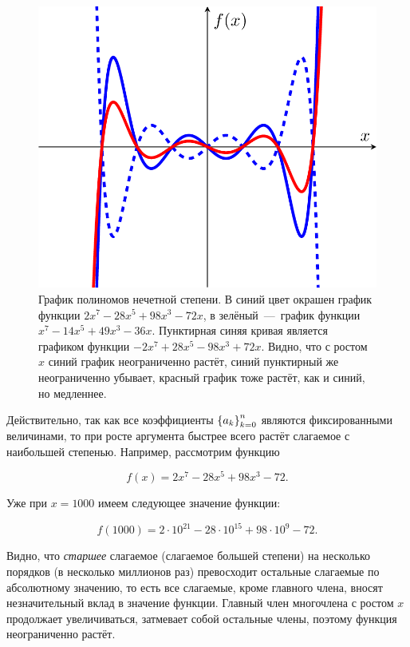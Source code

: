\documentclass[12pt]{article}
\begin{document}
\begin{figure}[htbp]
  \label{fig:1}
	\centering
	\includegraphics[width=1\linewidth]{fig1}
	\caption{График полиномов нечетной степени. В синий цвет окрашен график функции $2x^{7} - 28 x^{5} + 98 x^{3} - 72 x$, в зелёный~\----~график функции $x^{7} - 14 x^{5} + 49 x^{3} - 36 x$. Пунктирная синяя кривая является графиком функции $-2x^{7} + 28 x^{5} -98 x^{3} + 72 x$. Видно, что с ростом $x$ синий график неограниченно растёт, синий пунктирный же неограниченно убывает, красный график тоже растёт, как и синий, но медленнее.}
\end{figure}

Действительно, так как все коэффициенты $\qty{a_k}_{k=0}^n$ являются фиксированными величинами, то при росте аргумента быстрее всего растёт слагаемое с наибольшей степенью. Например, рассмотрим функцию

\begin{equation}
f(x)=2x^{7} - 28 x^{5} + 98 x^{3} - 72.
\end{equation}

Уже при $x = 1000$ имеем следующее значение функции:

\begin{equation}
f(1000) = 2 \cdot 10^{21} - 28 \cdot 10^{15} + 98 \cdot 10^9 - 72.
\end{equation}

Видно, что \emph{старшее} слагаемое (слагаемое большей степени) на несколько порядков (в несколько миллионов раз) превосходит остальные слагаемые по абсолютному значению, то есть все слагаемые, кроме главного члена, вносят незначительный вклад в значение функции. Главный член многочлена с ростом $x$ продолжает увеличиваться, затмевает собой остальные члены, поэтому функция неограниченно растёт.
\end{document}
